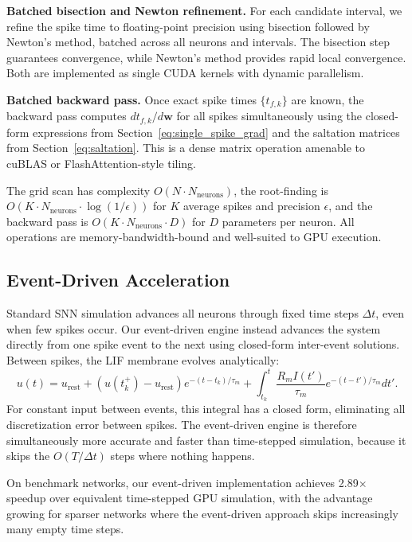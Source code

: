 \documentclass[10pt,twocolumn]{article}
\begin{document}
\textbf{Batched bisection and Newton refinement.} For each candidate interval, we refine the spike time to floating-point precision using bisection followed by Newton's method, batched across all neurons and intervals. The bisection step guarantees convergence, while Newton's method provides rapid local convergence. Both are implemented as single CUDA kernels with dynamic parallelism.

\textbf{Batched backward pass.} Once exact spike times $\{t_{f,k}\}$ are known, the backward pass computes $dt_{f,k}/d\mathbf{w}$ for all spikes simultaneously using the closed-form expressions from Section~\ref{eq:single_spike_grad} and the saltation matrices from Section~\ref{eq:saltation}. This is a dense matrix operation amenable to cuBLAS or FlashAttention-style tiling.

The grid scan has complexity $O(N \cdot N_{\text{neurons}})$, the root-finding is $O(K \cdot N_{\text{neurons}} \cdot \log(1/\epsilon))$ for $K$ average spikes and precision $\epsilon$, and the backward pass is $O(K \cdot N_{\text{neurons}} \cdot D)$ for $D$ parameters per neuron. All operations are memory-bandwidth-bound and well-suited to GPU execution.

\subsection{Event-Driven Acceleration}

Standard SNN simulation advances all neurons through fixed time steps $\Delta t$, even when few spikes occur. Our event-driven engine instead advances the system directly from one spike event to the next using closed-form inter-event solutions. Between spikes, the LIF membrane evolves analytically:
\begin{equation}
    u(t) = u_{\text{rest}} + (u(t_k^+) - u_{\text{rest}}) e^{-(t - t_k)/\tau_m} + \int_{t_k}^{t} \frac{R_m I(t')}{\tau_m} e^{-(t - t')/\tau_m} dt'.
\end{equation}
For constant input between events, this integral has a closed form, eliminating all discretization error between spikes. The event-driven engine is therefore simultaneously more accurate and faster than time-stepped simulation, because it skips the $O(T/\Delta t)$ steps where nothing happens.

On benchmark networks, our event-driven implementation achieves 2.89$\times$ speedup over equivalent time-stepped GPU simulation, with the advantage growing for sparser networks where the event-driven approach skips increasingly many empty time steps.
\end{document}

